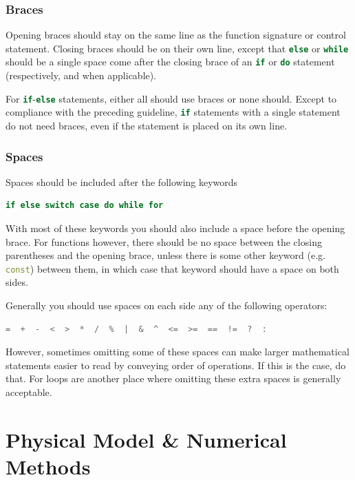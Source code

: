 \documentclass[11pt]{report}
\newcommand{\cpp}[1]{\lstinline[language=C++]{#1}}
\begin{document}
\subsection{Braces}
Opening braces should stay on the same line as the function signature or control statement.
Closing braces should be on their own line, except that \cpp{else} or \cpp{while} should be a single space come after the closing brace of an \cpp{if} or \cpp{do} statement (respectively, and when applicable).

For \cpp{if}-\cpp{else} statements, either all should use braces or none should. 
Except to compliance with the preceding guideline,  \cpp{if} statements with a single statement do not need braces, even if the statement is placed on its own line. 

\subsection{Spaces}

Spaces should be included after the following keywords
\begin{lstlisting}[language=C++]
if else switch case do while for
\end{lstlisting}
With most of these keywords you should also include a space before the opening brace. For functions however, there should be no space between the closing parentheses and the opening brace, unless there is some other keyword (e.g. \cpp{const}) between them, in which case that keyword should have a space on both sides.


Generally you should use spaces on each side any of the following operators:
\begin{lstlisting}[language=C++]
=  +  -  <  >  *  /  %  |  &  ^  <=  >=  ==  !=  ?  :
\end{lstlisting}
However, sometimes omitting some of these spaces can make larger mathematical statements easier to read by conveying order of operations. If this is the case, do that. For loops are another place where omitting these extra spaces is generally acceptable.


\chapter{Physical Model \& Numerical Methods}
\label{ch:physics}
\end{document}
